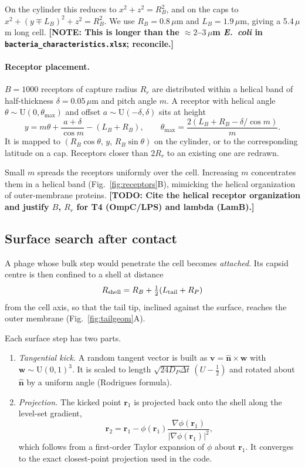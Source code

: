 \documentclass[12pt]{article}
\newcommand{\note}[1]{{\color{red}\textbf{[NOTE: #1]}}}
\newcommand{\todo}[1]{{\color{blue}\textbf{[TODO: #1]}}}
\begin{document}
On the cylinder this reduces to $x^2+z^2=R_B^2$, and on the caps to $x^2+(y\mp L_B)^2+z^2=R_B^2$. We use $R_B=0.8\,\mu$m and $L_B=1.9\,\mu$m, giving a 5.4\,$\mu$m long cell. \note{This is longer than the $\approx2$--$3\,\mu$m \textit{E.~coli} in \texttt{bacteria\_characteristics.xlsx}; reconcile.}

\paragraph{Receptor placement.} $B=1000$ receptors of capture radius $R_r$ are distributed within a helical band of half-thickness $\delta=0.05\,\mu$m and pitch angle $m$. A receptor with helical angle $\theta\sim\mathrm U(0,\theta_{\max})$ and offset $a\sim\mathrm U(-\delta,\delta)$ sits at height
\begin{equation}
y=m\theta+\frac{a+\delta}{\cos m}-(L_B+R_B),\qquad \theta_{\max}=\frac{2(L_B+R_B-\delta/\cos m)}{m}.
\end{equation}
It is mapped to $(R_B\cos\theta,\,y,\,R_B\sin\theta)$ on the cylinder, or to the corresponding latitude on a cap. Receptors closer than $2R_r$ to an existing one are redrawn.

Small $m$ spreads the receptors uniformly over the cell. Increasing $m$ concentrates them in a helical band (Fig.~\ref{fig:receptors}B), mimicking the helical organization of outer-membrane proteins. \todo{Cite the helical receptor organization and justify $B$, $R_r$ for T4 (OmpC/LPS) and lambda (LamB).}

\subsection*{Surface search after contact}
A phage whose bulk step would penetrate the cell becomes \emph{attached}. Its capsid centre is then confined to a shell at distance
\begin{equation}
R_{\rm shell}=R_B+\tfrac12(L_{\rm tail}+R_P)
\end{equation}
from the cell axis, so that the tail tip, inclined against the surface, reaches the outer membrane (Fig.~\ref{fig:tailgeom}A).

Each surface step has two parts.
\begin{enumerate}\setlength\itemsep{0pt}
\item \emph{Tangential kick.} A random tangent vector is built as $\bm v=\hat{\bm n}\times\bm w$ with $\bm w\sim\mathrm U(0,1)^3$. It is scaled to length $\sqrt{24D_P\Delta t}\,(U-\tfrac12)$ and rotated about $\hat{\bm n}$ by a uniform angle (Rodrigues formula).
\item \emph{Projection.} The kicked point $\bm r_1$ is projected back onto the shell along the level-set gradient,
\begin{equation}
\bm r_2=\bm r_1-\phi(\bm r_1)\frac{\nabla\phi(\bm r_1)}{|\nabla\phi(\bm r_1)|^2},
\end{equation}
which follows from a first-order Taylor expansion of $\phi$ about $\bm r_1$. It converges to the exact closest-point projection used in the code.
\end{enumerate}
\end{document}
